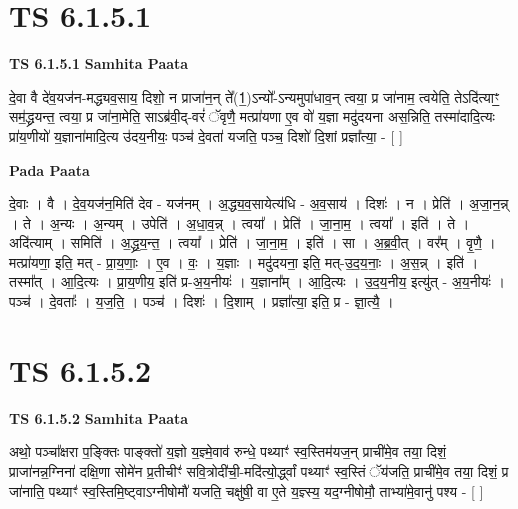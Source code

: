 \documentclass[17pt]{extarticle}
\begin{document}

\section{ TS 6.1.5.1 }

\textbf{TS 6.1.5.1 } \newline
\textbf{Samhita Paata} \newline

दे॒वा वै दे॑व॒यज॑न-मद्ध्यव॒साय॒ दिशो॒ न प्राजा॑न॒न् ते᳚(1॒)ऽन्यो᳚-ऽन्यमुपा॑धाव॒न् त्वया॒ प्र जा॑नाम॒ त्वयेति॒ तेऽदि॑त्याꣳ॒॒ सम॒॑द्ध्रयन्त॒ त्वया॒ प्र जा॑ना॒मेति॒ साऽब्र॑वी॒द्-वरं॑ ॅवृणै॒ मत्प्रा॑यणा ए॒व वो॑ य॒ज्ञा मदु॑दयना अस॒न्निति॒ तस्मा॑दादि॒त्यः प्रा॑य॒णीयो॑ य॒ज्ञाना॑मादि॒त्य उ॑दय॒नीयः॒ पञ्च॑ दे॒वता॑ यजति॒ पञ्च॒ दिशो॑ दि॒शां प्रज्ञा᳚त्या॒ - [  ] \newline

\textbf{Pada Paata} \newline

दे॒वाः । वै । दे॒व॒यज॑न॒मिति॑ देव - यज॑नम् । अ॒द्ध्य॒व॒सायेत्य॑धि - अ॒व॒साय॑ । दिशः॑ । न । प्रेति॑ । अ॒जा॒न॒न्न् । ते । अ॒न्यः । अ॒न्यम् । उपेति॑ । अ॒धा॒व॒न्न् । त्वया᳚ । प्रेति॑ । जा॒ना॒म॒ । त्वया᳚ । इति॑ । ते । अदि॑त्याम् । समिति॑ । अ॒द्ध्र॒य॒न्त॒ । त्वया᳚ । प्रेति॑ । जा॒ना॒म॒ । इति॑ । सा । अ॒ब्र॒वी॒त् । वर᳚म् । वृ॒णै॒ । मत्प्रा॑यणा॒ इति॒ मत् - प्रा॒य॒णाः॒ । ए॒व । वः॒ । य॒ज्ञाः । मदु॑दयना॒ इति॒ मत्-उ॒द॒य॒नाः॒ । अ॒स॒न्न् । इति॑ । तस्मा᳚त् । आ॒दि॒त्यः । प्रा॒य॒णीय॒ इति॑ प्र-अ॒य॒नीयः॑ । य॒ज्ञाना᳚म् । आ॒दि॒त्यः । उ॒द॒य॒नीय॒ इत्यु॑त् - अ॒य॒नीयः॑ । पञ्च॑ । दे॒वताः᳚ । य॒ज॒ति॒ । पञ्च॑ । दिशः॑ । दि॒शाम् । प्रज्ञा᳚त्या॒ इति॒ प्र - ज्ञा॒त्यै॒ ।  \newline





\section{ TS 6.1.5.2 }

\textbf{TS 6.1.5.2 } \newline
\textbf{Samhita Paata} \newline

अथो॒ पञ्चा᳚क्षरा प॒ङ्क्तिः पाङ्क्तो॑ य॒ज्ञो य॒ज्ञ्मे॒वाव॑ रुन्धे॒ पथ्याꣳ॑ स्व॒स्तिम॑यज॒न् प्राची॑मे॒व तया॒ दिशं॒ प्राजा॑नन्न॒ग्निना॑ दक्षि॒णा सोमे॑न प्र॒तीचीꣳ॑ सवि॒त्रोदी॑ची॒-मदि॑त्यो॒र्द्ध्वां पथ्याꣳ॑ स्व॒स्तिं  ॅय॑जति॒ प्राची॑मे॒व तया॒ दिशं॒ प्र जा॑नाति॒ पथ्याꣳ॑ स्व॒स्तिमि॒ष्ट्वाऽग्नीषोमौ॑ यजति॒ चक्षु॑षी॒ वा ए॒ते य॒ज्ञ्स्य॒ यद॒ग्नीषोमौ॒ ताभ्या॑मे॒वानु॑ पश्य - [  ] \newline
\end{document}
